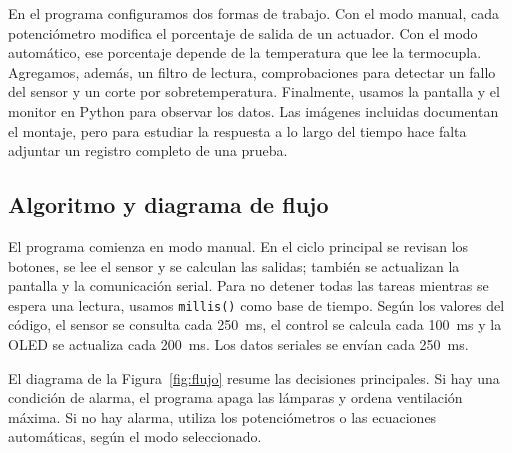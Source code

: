 \documentclass[11pt,letterpaper]{article}
\begin{document}
En el programa configuramos dos formas de trabajo. Con el modo manual, cada potenciómetro modifica el porcentaje de salida de un actuador. Con el modo automático, ese porcentaje depende de la temperatura que lee la termocupla. Agregamos, además, un filtro de lectura, comprobaciones para detectar un fallo del sensor y un corte por sobretemperatura. Finalmente, usamos la pantalla y el monitor en Python para observar los datos. Las imágenes incluidas documentan el montaje, pero para estudiar la respuesta a lo largo del tiempo hace falta adjuntar un registro completo de una prueba.

\subsection{Algoritmo y diagrama de flujo}
El programa comienza en modo manual. En el ciclo principal se revisan los botones, se lee el sensor y se calculan las salidas; también se actualizan la pantalla y la comunicación serial. Para no detener todas las tareas mientras se espera una lectura, usamos \texttt{millis()} como base de tiempo. Según los valores del código, el sensor se consulta cada \SI{250}{\milli\second}, el control se calcula cada \SI{100}{\milli\second} y la OLED se actualiza cada \SI{200}{\milli\second}. Los datos seriales se envían cada \SI{250}{\milli\second}.

El diagrama de la Figura~\ref{fig:flujo} resume las decisiones principales. Si hay una condición de alarma, el programa apaga las lámparas y ordena ventilación máxima. Si no hay alarma, utiliza los potenciómetros o las ecuaciones automáticas, según el modo seleccionado.
\end{document}
